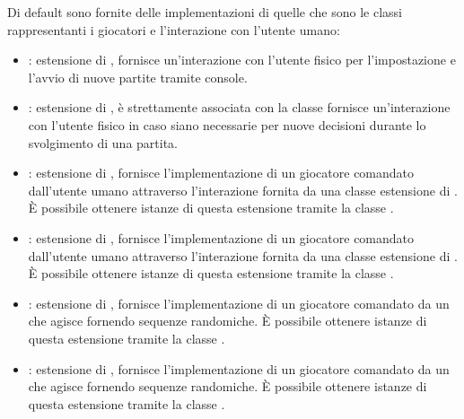 \documentclass[letterpaper,10pt,italian,openany,oneside]{sphinxmanual}
\begin{document}
Di default sono fornite delle implementazioni di quelle che sono le classi rappresentanti i giocatori e l’interazione con l’utente umano:
\begin{itemize}
\item {} 
: estensione di , fornisce un’interazione con l’utente fisico per l’impostazione e l’avvio di nuove partite tramite console.

\item {} 
: estensione di , è strettamente associata con la classe  fornisce un’interazione con l’utente fisico in caso siano necessarie per  nuove decisioni durante lo svolgimento di una partita.

\item {} 
: estensione di , fornisce l’implementazione di un giocatore comandato dall’utente umano attraverso l’interazione fornita da una classe estensione di . È possibile ottenere istanze di questa estensione tramite la classe .

\item {} 
: estensione di , fornisce l’implementazione di un giocatore comandato dall’utente umano attraverso l’interazione fornita da una classe estensione di . È possibile ottenere istanze di questa estensione tramite la classe .

\item {} 
: estensione di , fornisce l’implementazione di un giocatore comandato da un  che agisce fornendo sequenze randomiche. È possibile ottenere istanze di questa estensione tramite la classe .

\item {} 
: estensione di , fornisce l’implementazione di un giocatore comandato da un  che agisce fornendo sequenze randomiche. È possibile ottenere istanze di questa estensione tramite la classe .

\end{itemize}
\end{document}
